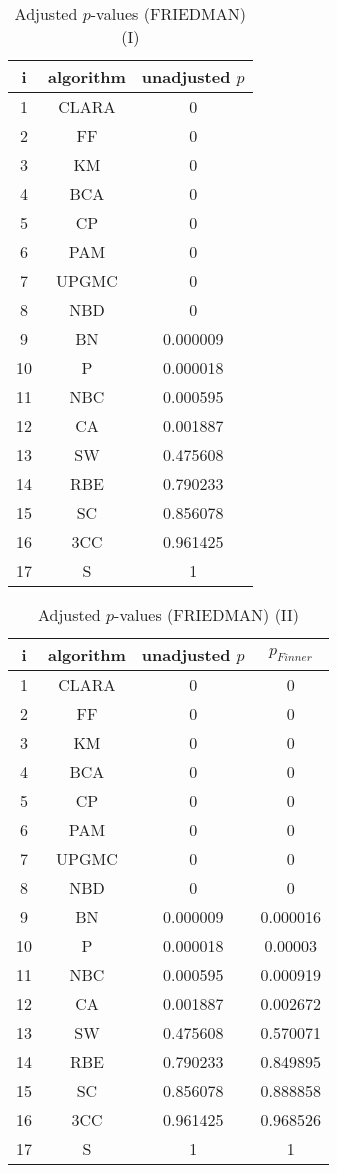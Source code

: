 \documentclass[a4paper,10pt]{article}
\begin{document}
\begin{landscape}
\begin{table}[!htp]
\centering\small
\begin{tabular}{ccc}
i&algorithm&unadjusted $p$\\
\hline1&CLARA&0\\2&FF&0\\3&KM&0\\4&BCA&0\\5&CP&0\\6&PAM&0\\7&UPGMC&0\\8&NBD&0\\9&BN&0.000009\\10&P&0.000018\\11&NBC&0.000595\\12&CA&0.001887\\13&SW&0.475608\\14&RBE&0.790233\\15&SC&0.856078\\16&3CC&0.961425\\17&S&1\\\hline
\end{tabular}
\caption{Adjusted $p$-values (FRIEDMAN) (I)}
\end{table}
\begin{table}[!htp]
\centering\small
\begin{tabular}{cccc}
i&algorithm&unadjusted $p$&$p_{Finner}$\\
\hline1&CLARA&0&0\\2&FF&0&0\\3&KM&0&0\\4&BCA&0&0\\5&CP&0&0\\6&PAM&0&0\\7&UPGMC&0&0\\8&NBD&0&0\\9&BN&0.000009&0.000016\\10&P&0.000018&0.00003\\11&NBC&0.000595&0.000919\\12&CA&0.001887&0.002672\\13&SW&0.475608&0.570071\\14&RBE&0.790233&0.849895\\15&SC&0.856078&0.888858\\16&3CC&0.961425&0.968526\\17&S&1&1\\\hline
\end{tabular}
\caption{Adjusted $p$-values (FRIEDMAN) (II)}
\end{table}

\newpage
\end{landscape}
\end{document}
